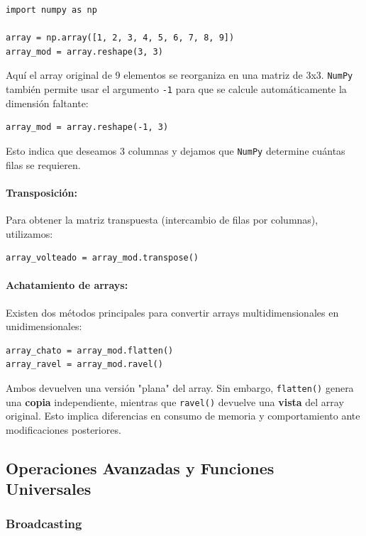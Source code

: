 \documentclass{article}
\theoremstyle{nonumberplain}
\begin{document}
\begin{verbatim}
import numpy as np

array = np.array([1, 2, 3, 4, 5, 6, 7, 8, 9])
array_mod = array.reshape(3, 3)
\end{verbatim}

Aquí el array original de 9 elementos se reorganiza en una matriz de 3x3. \texttt{NumPy} también permite usar el argumento \texttt{-1} para que se calcule automáticamente la dimensión faltante:

\begin{verbatim}
array_mod = array.reshape(-1, 3)
\end{verbatim}

Esto indica que deseamos 3 columnas y dejamos que \texttt{NumPy} determine cuántas filas se requieren.

\paragraph{Transposición:}

Para obtener la matriz transpuesta (intercambio de filas por columnas), utilizamos:

\begin{verbatim}
array_volteado = array_mod.transpose()
\end{verbatim}

\paragraph{Achatamiento de arrays:}

Existen dos métodos principales para convertir arrays multidimensionales en unidimensionales:

\begin{verbatim}
array_chato = array_mod.flatten()
array_ravel = array_mod.ravel()
\end{verbatim}

Ambos devuelven una versión "plana" del array. Sin embargo, \texttt{flatten()} genera una \textbf{copia} independiente, mientras que \texttt{ravel()} devuelve una \textbf{vista} del array original. Esto implica diferencias en consumo de memoria y comportamiento ante modificaciones posteriores.

\subsection*{Operaciones Avanzadas y Funciones Universales}

\subsubsection*{Broadcasting}
\end{document}
